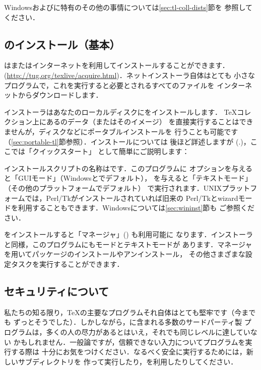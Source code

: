 \documentclass[uplatex,dvipdfmx]{jsarticle}
\begin{document}
Windowsおよび\macOS に特有のその他の事情については\ref{sec:tl-coll-dists}節を
参照してください．

\subsection{\TL のインストール（基本）}
\label{sec:basic}

\TL は\DVD またはインターネットを利用してインストールすることができます．
(\url{http://tug.org/texlive/acquire.html})．ネットインストーラ自体はとても
小さなプログラムで，これを実行すると必要とされるすべてのファイルを
インターネットからダウンロードします．

\DVD インストーラはあなたのローカルディスクに\TL をインストールします．
\TeX コレクション\DVD 上にある\TL のデータ（またはそのイメージ）
を直接実行することはできませんが，\USB ディスクなどにポータブルインストールを
行うことも可能です（\ref{sec:portable-tl}節参照）．インストールについては
後ほど詳述しますが (\p.\pageref{sec:install})，ここでは「クイックスタート」
として簡単にご説明します：

\begin{itemize*}
\item インストールスクリプトの名称はです．このプログラムに
オプションを与えると「GUIモード」（Windowsと\macOS でデフォルト），
を与えると「テキストモード」（その他のプラットフォームでデフォルト）
で実行されます．UNIXプラットフォームでは，Perl/Tkがインストールされていれば旧来の
Perl/Tkとwizardモードを利用することもできます．Windowsについては\ref{sec:wininst}節も
ご参照ください．

\item \TL をインストールすると「\TL マネージャ」() も利用可能に
なります．インストーラと同様，このプログラムにも\GUI モードとテキストモードが
あります．\TL マネージャを用いてパッケージのインストールやアンインストール，
その他さまざまな設定タスクを実行することができます．
\end{itemize*}

\subsection{セキュリティについて}
\label{sec:security}

私たちの知る限り，\TeX の主要なプログラムそれ自体はとても堅牢です（今までも
ずっとそうでした）．しかしながら，\TL に含まれる多数のサードパーティ製
プログラムは，多くの人の尽力があるとはいえ，それでも同じレベルに達していない
かもしれません．一般論ですが，信頼できない入力についてプログラムを実行する際は
十分にお気をつけください．なるべく安全に実行するためには，新しいサブディレクトリを
作って実行したり，を利用したりしてください．
\end{document}

